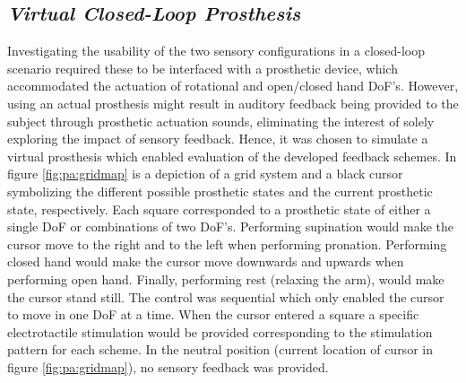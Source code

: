 

\subsection{\textit{Virtual Closed-Loop Prosthesis}}

Investigating the usability of the two sensory configurations in a closed-loop scenario required these to be interfaced with a prosthetic device, which accommodated the actuation of rotational and open/closed hand DoF's. However, using an actual prosthesis might result in auditory feedback being provided to the subject through prosthetic actuation sounds, eliminating the interest of solely exploring the impact of sensory feedback. Hence, it was chosen to simulate a virtual prosthesis which enabled evaluation of the developed feedback schemes. In figure \ref{fig:pa:gridmap} is a depiction of a grid system and a black cursor symbolizing the different possible prosthetic states and the current prosthetic state, respectively. Each square corresponded to a prosthetic state of either a single DoF or combinations of two DoF's. Performing supination would make the cursor move to the right and to the left when performing pronation. Performing closed hand would make the cursor move downwards and upwards when performing open hand. Finally, performing rest (relaxing the arm), would make the cursor stand still. The control was sequential which only enabled the cursor to move in one DoF at a time. When the cursor entered a square a specific electrotactile stimulation would be provided corresponding to the stimulation pattern for each scheme. In the neutral position (current location of cursor in figure \ref{fig:pa:gridmap}), no sensory feedback was provided.     


